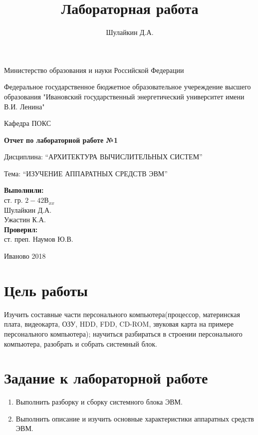 \documentclass[a4paper]{article}
\title{Лабораторная работа}
\author{Шулайкин Д.А.}
\begin{document}
\onehalfspacing
\thispagestyle{empty}
\begin{center}
Министерство образования и науки Российской Федерации
\vspace{10pt}

Федеральное государственное бюджетное образовательное учереждение высшего образования "Ивановский государственный энергетический университет имени В.И. Ленина"
\vspace{40pt}

Кафедра ПОКС
\vspace{40pt}

\textbf{Отчет по лабораторной работе №1}

Дисциплина: ``АРХИТЕКТУРА ВЫЧИСЛИТЕЛЬНЫХ СИСТЕМ''

Тема: ``ИЗУЧЕНИЕ АППАРАТНЫХ СРЕДСТВ ЭВМ''

\end{center}

\vspace{330pt}
\begin{flushright}
\textbf{Выполнили:} \\
ст. гр. $2-42В_{xx}$ \\
Шулайкин Д.А. \\
Ужастин К.А. \\

\textbf{Проверил:} \\
ст. преп. Наумов Ю.В.

\end{flushright}
\vspace{40pt}
\begin{center}
Иваново 2018
\end{center}
\pagebreak

\section{Цель работы} Изучить составные части персонального компьютера(процессор, материнская плата, видеокарта, ОЗУ, HDD, FDD, CD-ROM, звуковая карта на примере персонального компьютера); научиться разбираться в строении персонального компьютера, разобрать и собрать системный блок. 

\section{Задание к лабораторной работе}
\begin{enumerate}
\item Выполнить разборку и сборку системного блока ЭВМ. 
\item Выполнить описание и изучить основные характеристики аппаратных средств ЭВМ.
\end{enumerate}
\end{document}
